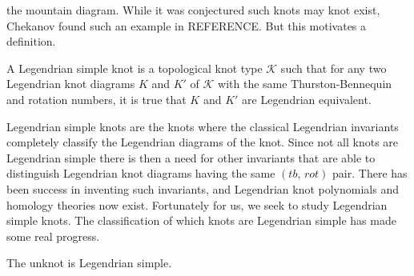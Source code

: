     the mountain diagram. While it was conjectured such knots may knot exist,
    Chekanov found such an example in REFERENCE. But this motivates a
    definition.
    \begin{definition}
        A Legendrian simple knot is a topological knot type $\mathcal{K}$
        such that for any two Legendrian knot diagrams $K$ and $K'$ of
        $\mathcal{K}$ with the same Thurston-Bennequin and rotation numbers,
        it is true that $K$ and $K'$ are Legendrian equivalent.
    \end{definition}
    Legendrian simple knots are the knots where the classical Legendrian
    invariants completely classify the Legendrian diagrams of the knot. Since
    not all knots are Legendrian simple there is then a need for other
    invariants that are able to distinguish Legendrian knot diagrams having
    the same $(tb,\,rot)$ pair. There has been success in inventing such
    invariants, and Legendrian knot polynomials and homology theories now
    exist. Fortunately for us, we seek to study Legendrian simple knots. The
    classification of which knots are Legendrian simple has made some real
    progress.
    \begin{theorem}
        The unknot is Legendrian simple.
    \end{theorem}
